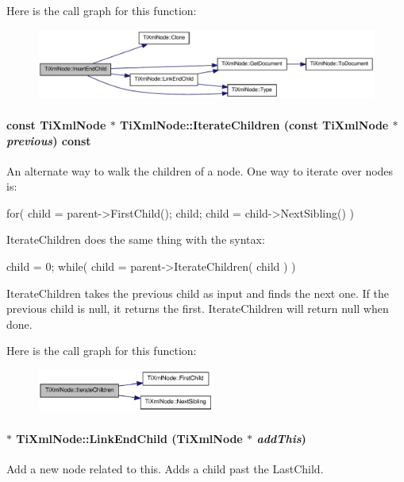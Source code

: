Here is the call graph for this function:\nopagebreak
\begin{figure}[H]
\begin{center}
\leavevmode
\includegraphics[width=332pt]{class_ti_xml_node_af287a913ce46d8dbf7ef24fec69bbaf0_cgraph}
\end{center}
\end{figure}
\hypertarget{class_ti_xml_node_aaef7ac3978c4bb1cc8a24ffae7bced75}{
\paragraph[{IterateChildren}]{\setlength{\rightskip}{0pt plus 5cm}const {\bf TiXmlNode} $\ast$ TiXmlNode::IterateChildren (const {\bf TiXmlNode} $\ast$ {\em previous}) const}\hfill}
\label{class_ti_xml_node_aaef7ac3978c4bb1cc8a24ffae7bced75}
An alternate way to walk the children of a node. One way to iterate over nodes is: \begin{DoxyVerb}
			for( child = parent->FirstChild(); child; child = child->NextSibling() )
		\end{DoxyVerb}


IterateChildren does the same thing with the syntax: \begin{DoxyVerb}
			child = 0;
			while( child = parent->IterateChildren( child ) )
		\end{DoxyVerb}


IterateChildren takes the previous child as input and finds the next one. If the previous child is null, it returns the first. IterateChildren will return null when done. 

Here is the call graph for this function:\nopagebreak
\begin{figure}[H]
\begin{center}
\leavevmode
\includegraphics[width=166pt]{class_ti_xml_node_aaef7ac3978c4bb1cc8a24ffae7bced75_cgraph}
\end{center}
\end{figure}
\hypertarget{class_ti_xml_node_a1a881212554b759865f6cac79a851d38}{
\paragraph[{LinkEndChild}]{ $\ast$ TiXmlNode::LinkEndChild ({\bf TiXmlNode} $\ast$ {\em addThis})}\hfill}
\label{class_ti_xml_node_a1a881212554b759865f6cac79a851d38}
Add a new node related to this. Adds a child past the LastChild.

